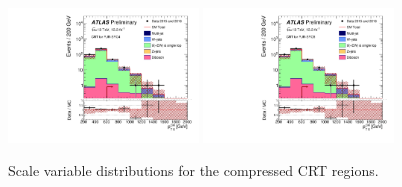 \begin{figure}[tbp]
\begin{center}
\includegraphics[width=0.45\textwidth]{figures/ATLAS-CONF-2016-078_INT/N-1Plots/AtlasStyle/Preliminary/CRT_SRJigsawSRC4_LastCut_CRT_minusone}
\includegraphics[width=0.45\textwidth]{figures/ATLAS-CONF-2016-078_INT/N-1Plots/AtlasStyle/Preliminary/CRT_SRJigsawSRC5_LastCut_CRT_minusone}
\end{center}
\caption{Scale variable distributions for the compressed CRT regions.}
\label{fig:CRT_SRJigsawSRC1_LastCut_CRT_minusone}
\end{figure}

